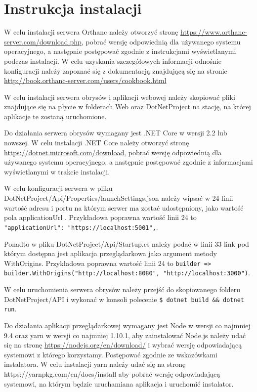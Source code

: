 \documentclass[a4paper,11pt,twoside,openright]{report}
\theoremstyle{definition}
\begin{document}




\chapter*{Instrukcja instalacji}

W celu instalacji serwera Orthanc należy otworzyć stronę \url{https://www.orthanc-server.com/download.php}, pobrać wersję odpowiednią dla używanego systemu operacyjnego, a następnie postępować zgodnie z instrukcjami wyświetlanymi podczas instalacji. W celu uzyskania szczegółowych informacji odnośnie konfiguracji należy zapoznać się z dokumentacją znajdującą się na stronie \url{http://book.orthanc-server.com/users/cookbook.html}

W celu instalacji serwera obrysów i aplikacji webowej należy skopiować pliki znajdujące się na płycie w folderach Web oraz DotNetProject na stację, na której aplikacje te zostaną uruchomione.

Do działania serwera obrysów wymagany jest .NET Core w wersji 2.2 lub nowszej. W celu instalacji .NET Core należy otworzyć stronę \url{https://dotnet.microsoft.com/download}, pobrać wersję odpowiednią dla używanego systemu operacyjnego, a następnie postępować zgodnie z informacjami wyświetlanymi w trakcie instalacji.

W celu konfiguracji serwera w pliku DotNetProject/Api/Properties/launchSettings.json należy wipsać w 24 linii  wartość adresu i portu na którym serwer ma zostać udostępniony, jako wartość pola applicationUrl . Przykładowa poprawna wartość linii 24 to\texttt{ "applicationUrl": "https://localhost:5001",}.

Ponadto w pliku DotNetProject/Api/Startup.cs należy podać w linii 33 link pod którym dostępna jest aplikacja przeglądarkowa jako argument metody WithOrigins.  Przykładowa poprawna wartość linii 24 to \texttt{builder => builder.WithOrigins("http://localhost:8080", "http://localhost:3000")}.

W celu uruchomienia serwera obrysów należy przejść do skopiowanego folderu DotNetProject/API i wykonać w konsoli polecenie \texttt{\$ dotnet build \&\& dotnet run}.

Do działania aplikacji przeglądarkowej wymagany jest Node w wersji co najmniej 9.4 oraz yarn w wersji co najmniej 1.10.1, aby zainstalować Node.js należy udać się na stronę \url{https://nodejs.org/en/download/} i wybrać wersję odpowiadającą systemowi z którego korzystamy. Postępować zgodnie ze wskazówkami instalatora. W celu instalacji yarn należy udać się na stronę https://yarnpkg.com/en/docs/install aby pobrać wersję odpowiadającą systemowi, na którym będzie uruchamiana aplikacja i uruchomić instalator.
\end{document}
